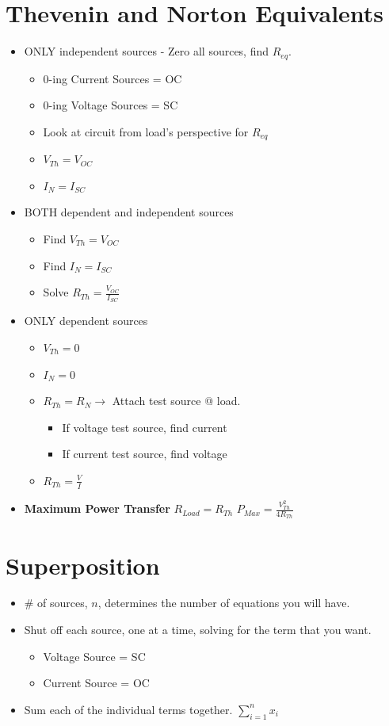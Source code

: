 \documentclass[10pt,letterpaper,twoside,notitlepage]{article}
\begin{document}
\section*{Thevenin and Norton Equivalents}
	\begin{itemize}
		\item ONLY independent sources - Zero all sources, find $R_{eq}$.
		\begin{itemize}
			\item 0-ing Current Sources = OC
			\item 0-ing Voltage Sources = SC
			\item Look at circuit from load's perspective for $R_{eq}$
			\item $V_{Th}=V_{OC}$
			\item $I_{N} = I_{SC}$
		\end{itemize}
		\item BOTH dependent and independent sources
			\begin{itemize}
				\item Find $V_{Th}=V_{OC}$
				\item Find $I_{N}=I_{SC}$
				\item Solve $R_{Th}=\frac{V_{OC}}{I_{SC}}$
			\end{itemize}
		\item ONLY dependent sources
			\begin{itemize}
				\item $V_{Th}=0$
				\item $I_{N}=0$
				\item $R_{Th}=R_{N} \rightarrow$ Attach test source @ load.
				\begin{itemize}
					\item If voltage test source, find current
					\item If current test source, find voltage
				\end{itemize}
				\item $R_{Th}=\frac{V}{I}$
			\end{itemize}
		\item \textbf{Maximum Power Transfer} \newline
			$R_{Load}=R_{Th}$ \newline \newline
			$P_{Max}=\frac{V_{Th}^2}{4R_{Th}}$
	\end{itemize}

\section*{Superposition}
	\begin{itemize}
		\item \# of sources, $n$, determines the number of equations you will have.
		\item Shut off each source, one at a time, solving for the term that you want.
		\begin{itemize}
			\item Voltage Source = SC
			\item Current Source = OC
		\end{itemize}
		\item Sum each of the individual terms together. $\sum_{i=1}^{n} x_{i}$
	\end{itemize}
\end{document}

